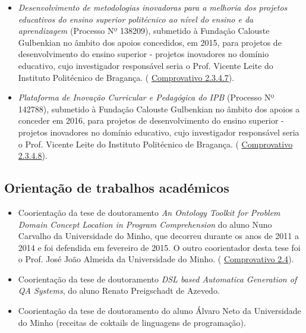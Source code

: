 \documentclass[11pt]{article}
\begin{document}
\begin{itemize}
\item{{
\em{ Desenvolvimento de metodologias inovadoras para a melhoria dos projetos educativos do ensino superior politécnico ao nível do ensino e da aprendizagem}} (Processo Nº 138209), submetido à Fundação Calouste Gulbenkian no âmbito dos apoios concedidos, em 2015, para projetos de desenvolvimento do ensino superior - projetos inovadores no domínio educativo, cujo investigador responsável seria o Prof. Vicente Leite do Instituto Politécnico de Bragança. (
\href{run:Projectos/CandidaturasNaoAprovadas/Gulbenkian2015.pdf}{Comprovativo 2.3.4.7}).}
\item{{
\em{ Plataforma de Inovação Curricular e Pedagógica do IPB}} (Processo Nº 142788), submetido à Fundação Calouste Gulbenkian no âmbito dos apoios a conceder em 2016, para projetos de desenvolvimento do ensino superior - projetos inovadores no domínio educativo, cujo investigador responsável seria o Prof. Vicente Leite do Instituto Politécnico de Bragança. (
\href{run:Projectos/CandidaturasNaoAprovadas/Gulbenkian2016.pdf}{Comprovativo 2.3.4.8}).}
\end{itemize}
\subsection{Orientação de trabalhos académicos}
\begin{itemize}
\item{Coorientação da tese de doutoramento 
\emph{An Ontology Toolkit for Problem Domain Concept Location in Program Comprehension} do aluno Nuno Carvalho da Universidade do Minho, que decorreu durante os anos de 2011 a 2014 e foi defendida em fevereiro de 2015. O outro coorientador desta tese foi o Prof. José João Almeida da Universidade do Minho. (
\href{run:CoOrientDout/DecMJVarndaMAPi.pdf}{Comprovativo 2.4}).}
\item{Coorientação da tese de doutoramento 
\emph{DSL based Automatica Generation of QA Systems}, do aluno Renato Preigschadt de Azevedo.}
\item{Coorientação da tese de doutoramento do aluno Álvaro Neto da Universidade do Minho (receitas de coktails de linguagens de programação).}
\end{itemize}
\end{document}
